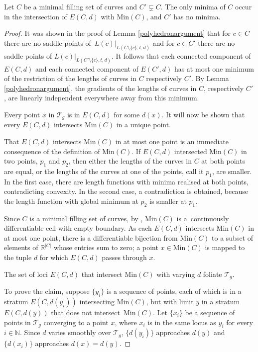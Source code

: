 \begin{Lemma}
\label{minimalem}
Let $C$ be a minimal filling set of curves and $C'\subsetneq C$. The only minima of $C$ occur in the intersection of $E(C,d)$ with $\mathrm{Min}(C)$, and $C'$ has no minima.
\end{Lemma}
\begin{proof}
It was shown in the proof of Lemma \ref{polyhedronargument} that for $c\in C$ there are no saddle points of~$L(c)|_{L(C\setminus\{c\},t,d)}$ and for $c\in C'$ there are no saddle points of $L(c)|_{L(C'\setminus\{c\},t,d)}$. It follows that each connected component of $E(C,d)$ and each connected component of $E(C',d)$ has at most one minimum of the restriction of the lengths of curves in $C$ respectively $C'$. By Lemma \ref{polyhedronargument}, the gradients of the lengths of curves in $C$, respectively $C'$, are linearly independent everywhere away from this minimum.

Every point $x$ in $\mathcal{T}_{g}$ is in $E(C,d)$ for some $d(x)$. It will now be shown that every $E(C,d)$ intersects $\mathrm{Min}(C)$ in a unique point.

That $E(C,d)$ intersects $\mathrm{Min}(C)$ in at most one point is an immediate consequence of the definition of $\mathrm{Min}(C)$. If $E(C,d)$ intersected $\mathrm{Min}(C)$ in two points, $p_{1}$ and $p_{2}$, then either the lengths of the curves in $C$ at both points are equal, or the lengths of the curves at one of the points, call it $p_{1}$, are smaller. In the first case, there are length functions with minima realised at both points, contradicting convexity. In the second case, a contradiction is obtained, because the length function with global minimum at $p_{2}$ is smaller at $p_{1}$.

Since $C$ is a minimal filling set of curves, by \cite[Lemma 9, Theorem 10]{SchmutzMorse}, $\mathrm{Min}(C)$ is a~continuously differentiable cell with empty boundary. As each $E(C,d)$ intersects $\mathrm{Min}(C)$ in at most one point, there is a differentiable bijection from $\mathrm{Min}(C)$ to a subset of elements of $\mathbb{R}^{|C|}$ whose entries sum to zero; a point $x\in \mathrm{Min}(C)$ is mapped to the tuple $d$ for which $E(C,d)$ passes through $x$.

\begin{Claim}
The set of loci $E(C,d)$ that intersect $\mathrm{Min}(C)$ with varying $d$ foliate $\mathcal{T}_{g}$.
\end{Claim}

To prove the claim, suppose $\{y_{i}\}$ is a sequence of points, each of which is in a stratum $E(C,d(y_{i}))$ intersecting $\mathrm{Min}(C)$, but with limit $y$ in a stratum $E(C,d(y))$ that does not intersect~$\mathrm{Min}(C)$. Let $\{x_{i}\}$ be a sequence of points in $\mathcal{T}_{g}$ converging to a point $x$, where $x_{i}$ is in the same locus as $y_{i}$ for every $i\in \mathbb{N}$. Since $d$ varies smoothly over $\mathcal{T}_{g}$, $\{d(y_{i})\}$ approaches $d(y)$ and~$\{d(x_{i})\}$ approaches $d(x)=d(y)$.


\end{proof}
